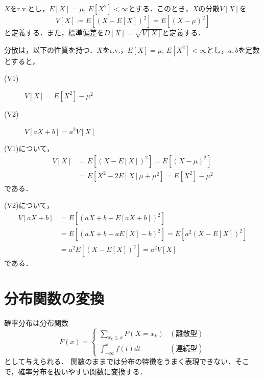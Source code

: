 \documentclass{jsreport}
\begin{document}
\begin{screen}
  \begin{defi}[分散]
    $X$をr.v.とし，$E[X] = \mu, \, E[X^2] < \infty$とする．このとき，$X$の分散$V[X]$を
    \begin{equation}
      V[X] \coloneqq E[(X - E[X])^2] = E[(X - \mu)^2] \nonumber
    \end{equation}
    と定義する．また，標準偏差を$D[X] = \sqrt{V[X]}$と定義する．
  \end{defi}
\end{screen}

分散は，以下の性質を持つ．$X$をr.v.，$E[X] = \mu, \, E[X^2] < \infty$とし，$a, b$を定数とすると，
\begin{description}
  \item[(V1)] $V[X] = E[X^2] - \mu^2$
  \item[(V2)] $V[aX + b] = a^2V[X]$
\end{description}

(V1)について，
\begin{align}
  V[X] &= E[(X-E[X])^2] = E[(X - \mu)^2] \nonumber \\
  &= E[X^2 - 2E[X]\mu + \mu^2] = E[X^2] - \mu^2 \nonumber
\end{align}
である．

(V2)について，
\begin{align}
  V[aX + b] &= E[(aX + b - E[aX + b])^2] \nonumber \\
  &= E[(aX + b - aE[X] -b)^2] = E[a^2(X - E[X])^2] \nonumber \\
  &= a^2 E[(X - E[X])^2] = a^2 V[X] \nonumber
\end{align}
である．

\section{分布関数の変換}
確率分布は分布関数
\begin{equation}
  F(x) = \begin{cases}
    \sum_{x_k \leq x} P(X = x_k) & (離散型) \\
    \int_{-\infty}^x f(t)dt & (連続型)
\end{cases}\nonumber
\end{equation}
として与えられる．
関数のままでは分布の特徴をうまく表現できない．そこで，確率分布を扱いやすい関数に変換する．
\end{document}
